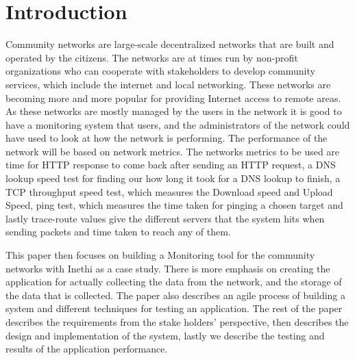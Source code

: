\section{Introduction}\label{sec:introduction}
Community networks are large-scale decentralized networks that are built and operated by the citizens\cite{Selimi:2014:TAD:2723218.2723265}.
The networks are at times run by non-profit organizations who can cooperate with stakeholders to develop community services, which include the internet and local networking\cite{Braem:2013:CRC:2500098.2500108}.
These networks are becoming more and more popular for providing Internet access to remote areas.
As these networks are mostly managed by the users in the network it is good to have a monitoring system that users, and the administrators of the network could have used to look at how the network is performing.
The performance of the network will be based on network metrics.
The networks metrics to be used are time for HTTP response to come back after sending an HTTP request, a DNS lookup speed test for finding our how long it took for a DNS lookup to finish, a TCP throughput speed test, which measures the Download speed and Upload Speed, ping test, which measures the time taken for pinging a chosen target and lastly trace-route values give the different servers that the system hits when sending packets and time taken to reach any of them.

This paper then focuses on building a Monitoring tool for the community networks with Inethi as a case study.
There is more emphasis on creating the application for actually collecting the data from the network, and the storage of the data that is collected.
The paper also describes an agile process of building a system and different techniques for testing an application.
The rest of the paper describes the requirements from the stake holders' perspective, then describes the design and implementation of the system, lastly we describe the testing and results of the application performance.